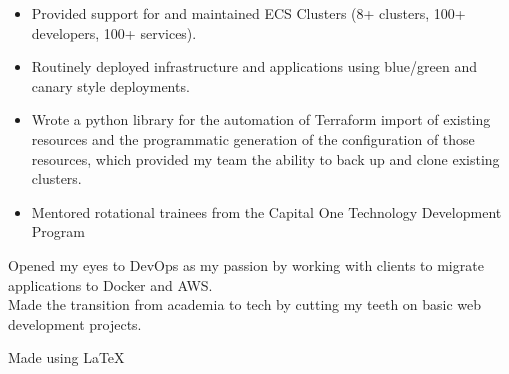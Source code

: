 \documentclass[]{resume}
\begin{document}
\begin{minipage}[t]{0.69\textwidth}
\begin{itemize}[leftmargin=5mm]
\setlength\itemsep{-1mm}
\item Provided support for and maintained ECS Clusters (8+ clusters, 100+ developers, 100+ services).
\item Routinely deployed infrastructure and applications using blue/green and canary style deployments.
\item Wrote a python library for the automation of Terraform import of existing resources and the programmatic generation of the configuration of those resources, which provided my team the ability to back up and clone existing clusters.
\item Mentored rotational trainees from the Capital One Technology Development Program
\end{itemize}
\sectionsep
\vspace{-3mm}

\vspace{1mm}
Opened my eyes to DevOps as my passion by working with clients to migrate applications to Docker and AWS. \\
\sectionsep
{}
\vspace{1mm}
Made the transition from academia to tech by cutting my teeth on basic web development projects.\\
\vspace{1mm}
\end{minipage}
\vfill
{\scriptsize Made using \LaTeX{} \hfill}
\end{document}
